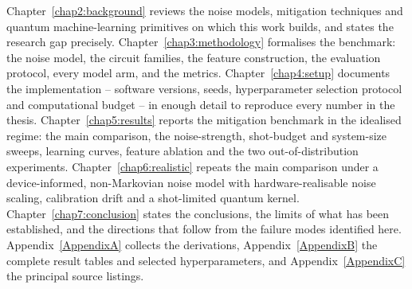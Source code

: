 \documentclass[Thesis.tex]{subfiles}
\begin{document}
Chapter~\ref{chap2:background} reviews the noise models, mitigation techniques and
quantum machine-learning primitives on which this work builds, and states the research gap precisely.
Chapter~\ref{chap3:methodology} formalises the benchmark: the noise model, the
circuit families, the feature construction, the evaluation protocol, every model
arm, and the metrics.
Chapter~\ref{chap4:setup} documents the implementation -- software versions, seeds,
hyperparameter selection protocol and computational budget -- in enough detail to
reproduce every number in the thesis.
Chapter~\ref{chap5:results} reports the mitigation benchmark in the idealised
regime: the main comparison, the noise-strength, shot-budget and system-size
sweeps, learning curves, feature ablation and the two out-of-distribution
experiments.
Chapter~\ref{chap6:realistic} repeats the main comparison under a
device-informed, non-Markovian noise model with hardware-realisable noise
scaling, calibration drift and a shot-limited quantum kernel.
Chapter~\ref{chap7:conclusion} states the conclusions, the limits of what has been
established, and the directions that follow from the failure modes identified here.
Appendix~\ref{AppendixA} collects the derivations,
Appendix~\ref{AppendixB} the complete result tables and selected hyperparameters,
and Appendix~\ref{AppendixC} the principal source listings.
\end{document}

